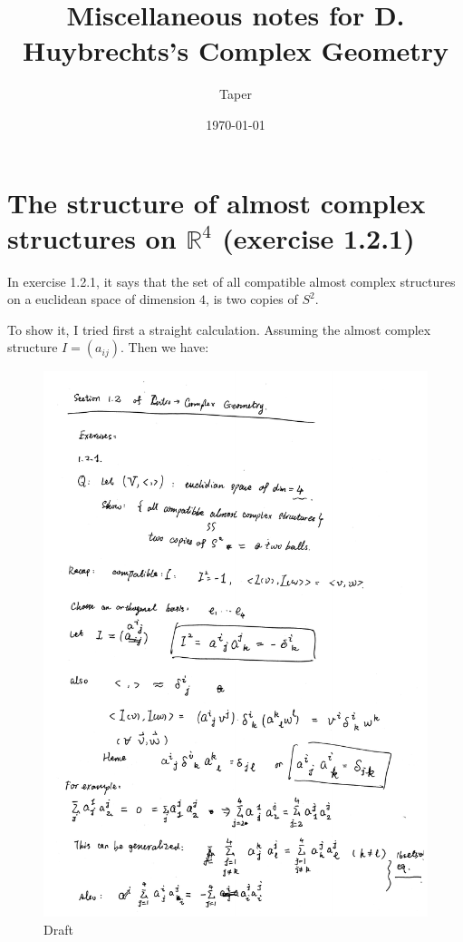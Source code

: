 \documentclass{article}
\title{Miscellaneous notes for D. Huybrechts's Complex Geometry}
\date{\today}
\author{Taper}
\numberwithin{equation}{subsection} %
\theoremstyle{definition}
\begin{document}
\maketitle
{}
\tableofcontents
\section{The structure of almost complex structures on \texorpdfstring{$\mathbb{R}^{4}$}{}
  (exercise 1.2.1)}
\label{sec:The_structure_of_almost_complex_structures_on_R2n}
In exercise 1.2.1, it says that the set of all compatible almost complex
structures on a euclidean space of dimension $4$, is two copies of $S^2$.

To show it, I tried first a straight calculation. Assuming the almost
complex structure $I= (a_{ij})$. Then we have:
\begin{figure}[H]
  \centering
  \includegraphics[scale=0.70]{pdfs/draft_20160908.pdf}
  \caption{Draft}
\end{figure}
\end{document}
